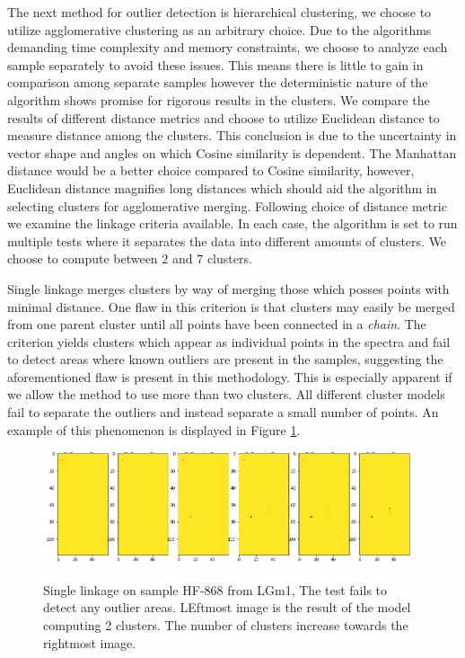 The next method for outlier detection is hierarchical clustering, we choose to utilize agglomerative clustering as an arbitrary choice. Due to the algorithms demanding time complexity and memory constraints, we choose to analyze each sample separately to avoid these issues. This means there is little to gain in comparison among separate samples however the deterministic nature of the algorithm shows promise for rigorous results in the clusters. We compare the results of different distance metrics and choose to utilize Euclidean distance to measure distance among the clusters. This conclusion is due to the uncertainty in vector shape and angles on which Cosine similarity is dependent. The Manhattan distance would be a better choice compared to Cosine similarity, however, Euclidean distance magnifies long distances which should aid the algorithm in selecting clusters for agglomerative merging. Following choice of distance metric we examine the linkage criteria available. In each case, the algorithm is set to run multiple tests where it separates the data into different amounts of clusters. We choose to compute between $2$ and $7$ clusters.

Single linkage merges clusters by way of merging those which posses points with minimal distance. One flaw in this criterion is that clusters may easily be merged from one parent cluster until all points have been connected in a \textit{chain}. The criterion yields clusters which appear as individual points in the spectra and fail to detect areas where known outliers are present in the samples, suggesting the aforementioned flaw is present in this methodology. This is especially apparent if we allow the method to use more than two clusters. All different cluster models fail to separate the outliers and instead separate a small number of points. An example of this phenomenon is displayed in Figure \ref{fig:SL_HF868}.

\begin{figure}[H]

    \centering
{\includegraphics[width=15cm]{images/Single_linkage/LGm-1/HF-868_1_2.h5_0.png} }
\caption{Single linkage on sample HF-868 from LGm1, The test fails to detect any outlier areas. LEftmost image is the result of the model computing 2 clusters. The number of clusters increase towards the rightmost image.\label{fig:SL_HF868}}%

\end{figure}

